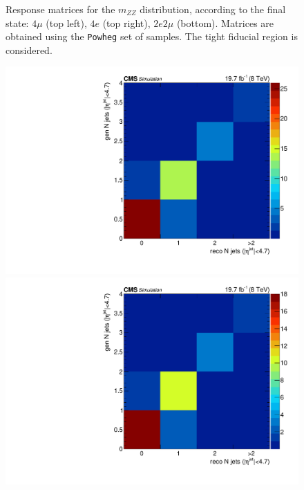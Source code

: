 \begin{figure}[hbtp]
\begin{center}
    \caption{Response matrices for the $m_{ZZ}$ distribution, according to the final state:  $4\mu$ (top left), $4e$ (top right), $2e2\mu$  (bottom). Matrices are obtained using the  \texttt{Powheg} set of samples. The tight fiducial region is considered.} 
    \label{fig:Mass_matrices}
  \end{center}
\end{figure}

\begin{figure}[hbtp]
  \begin{center}
    \includegraphics[width=\cmsFigWidth]{Figures/ResMat_qqggJJ_Jets_ZZTo4m_st_01_fr_Mad}
    \includegraphics[width=\cmsFigWidth]{Figures/ResMat_qqggJJ_Jets_ZZTo4e_st_01_fr_Mad}

\end{center}
\end{figure}
